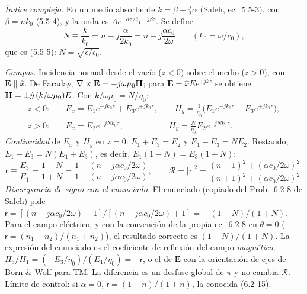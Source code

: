  \emph{Índice complejo.} En un medio absorbente $k=\beta-\frac{j}{2}\alpha$ (Saleh, ec.~5.5-3), con
$\beta=nk_0$ (5.5-4), y la onda es $Ae^{-\alpha z/2}e^{-j\beta z}$. Se define
\[
N\equiv\frac{k}{k_0}=n-j\frac{\alpha}{2k_0}=n-j\frac{\alpha c_0}{2\omega}\qquad(k_0=\omega/c_0),
\]
que es (5.5-5): $N=\sqrt{\epsilon/\epsilon_0}$.

\emph{Campos.} Incidencia normal desde el vacío ($z<0$) sobre el medio ($z>0$), con $\mathbf E\parallel\hat x$.
De Faraday, $\nabla\times\mathbf E=-j\omega\mu_0\mathbf H$; para $\mathbf E=\hat xEe^{\mp jkz}$ se obtiene
$\mathbf H=\pm\hat y\,(k/\omega\mu_0)E$. Con $k/\omega\mu_0=N/\eta_0$:
\begin{align*}
z<0:&\quad E_x=E_1e^{-jk_0z}+E_3e^{+jk_0z},\qquad H_y=\frac{1}{\eta_0}\big(E_1e^{-jk_0z}-E_3e^{+jk_0z}\big),\\
z>0:&\quad E_x=E_2e^{-jNk_0z},\qquad\qquad\quad\ \ H_y=\frac{N}{\eta_0}E_2e^{-jNk_0z}.
\end{align*}
\emph{Continuidad} de $E_x$ y $H_y$ en $z=0$: $E_1+E_3=E_2$ y $E_1-E_3=NE_2$. Restando,
$E_1-E_3=N(E_1+E_3)$, es decir, $E_1(1-N)=E_3(1+N)$:
\[
\mathsf r\equiv\frac{E_3}{E_1}=\frac{1-N}{1+N}=\frac{1-(n-j\alpha c_0/2\omega)}{1+(n-j\alpha c_0/2\omega)},\qquad
\mathcal R=|\mathsf r|^2=\frac{(n-1)^2+(\alpha c_0/2\omega)^2}{(n+1)^2+(\alpha c_0/2\omega)^2}.
\]
\emph{Discrepancia de signo con el enunciado.} El enunciado (copiado del Prob.~6.2-8 de Saleh) pide
$\mathsf r=[(n-j\alpha c_0/2\omega)-1]/[(n-j\alpha c_0/2\omega)+1]=-\,(1-N)/(1+N)$. Para el campo
eléctrico, y con la convención de la propia ec.~6.2-8 en $\theta=0$ ($\mathsf r=(n_1-n_2)/(n_1+n_2)$), el
resultado correcto es $(1-N)/(1+N)$. La expresión del enunciado es el coeficiente de reflexión del
campo \emph{magnético}, $H_3/H_1=(-E_3/\eta_0)/(E_1/\eta_0)=-\mathsf r$, o el de $\mathbf E$ con la
orientación de ejes de Born \& Wolf para TM. La diferencia es un desfase global de $\pi$ y no cambia
$\mathcal R$. Límite de control: si $\alpha=0$, $\mathsf r=(1-n)/(1+n)$, la conocida (6.2-15).


